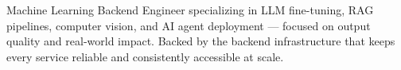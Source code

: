 



\begin{cvparagraph}
Machine Learning Backend Engineer specializing in LLM fine-tuning, RAG pipelines, computer vision, and AI agent deployment — focused on output quality and real-world impact. Backed by the backend infrastructure that keeps every service reliable and consistently accessible at scale.
\end{cvparagraph}